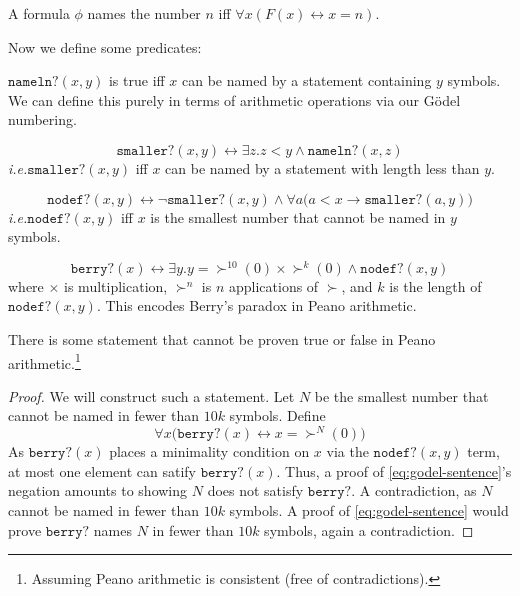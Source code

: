 \documentclass{scrbook}
\renewcommand{\implies}{\to}
\renewcommand{\iff}{\leftrightarrow}
\newcommand{\ie}{\emph{i.e.}\xspace}
\begin{document}
\begin{defn}[names]
  A formula $\phi$ names the number $n$ iff $\forall x (F(x)\iff x=n)$. 
\end{defn}
Now we define some predicates:
\newcommand{\namelen}{\texttt{nameln?}}
\begin{defn}[\namelen]
  $\namelen(x,y)$ is true iff $x$ can be named by a statement containing $y$ symbols. We can define this purely in terms of arithmetic operations via our Gödel numbering. 
\end{defn}
\newcommand{\namesmaller}{\texttt{smaller?}}
\begin{defn}[\namesmaller]
  \[
  \namesmaller(x,y)\iff \exists z .z < y \wedge \namelen(x,z)
  \]
  \ie $\namesmaller(x,y)$ iff $x$ can be named by a statement with length less than $y$. 
\end{defn}
\newcommand{\minnodef}{\texttt{nodef?}}
\begin{defn}[\minnodef]
  \[
  \minnodef(x,y)\iff \neg \namesmaller(x,y) \wedge \forall a \bigl(a < x \implies \namesmaller(a,y)\bigr)
  \]
  \ie $\minnodef(x,y)$ iff $x$ is the smallest number that cannot be named in $y$ symbols. 
\end{defn}
\newcommand{\berry}{\texttt{berry?}}
\begin{defn}[\berry]
  \[
  \berry(x) \iff\exists y. y=\succ^{10}(0)\times \succ^{k}(0)\wedge \minnodef(x,y)
  \]
  where $\times$ is multiplication, $\succ^n$ is $n$ applications of $\succ$, and $k$ is the length of $\minnodef(x,y)$.
  This encodes Berry's paradox in Peano arithmetic. 
\end{defn}
\begin{theorem}
  There is some statement that cannot be proven true or false in Peano arithmetic.\footnote{Assuming Peano arithmetic is consistent (free of contradictions).}
\end{theorem}
\begin{proof}
  We will construct such a statement. Let $N$ be the smallest number that cannot be named in fewer than $10k$ symbols. Define 
  \begin{equation}
    \label{eq:godel-sentence}
    \forall x \bigl(\berry (x) \iff x= \succ^N(0)\bigr)
  \end{equation}
  As $\berry(x)$ places a minimality condition on $x$ via the $\minnodef(x,y)$ term, at most one element can satify $\berry(x)$. Thus, 
  a proof of \cref{eq:godel-sentence}'s negation amounts to showing $N$ does not satisfy $\berry$. A contradiction, as $N$ cannot be named in fewer than $10k$ symbols. A proof of \cref{eq:godel-sentence} would prove $\berry$ names $N$ in fewer than $10k$ symbols, again a contradiction. 
\end{proof}
\end{document}

